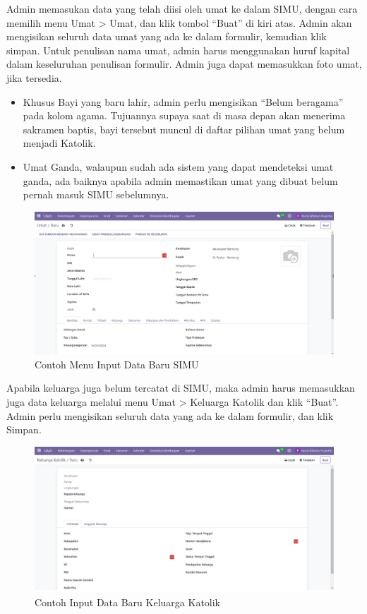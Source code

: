 Admin memasukan data yang telah diisi oleh umat ke dalam SIMU, dengan cara memilih menu Umat > Umat, dan klik tombol “Buat” di kiri atas. Admin akan mengisikan seluruh data umat yang ada ke dalam formulir, kemudian klik simpan. Untuk penulisan nama umat, admin harus menggunakan huruf kapital dalam keseluruhan penulisan formulir. Admin juga dapat memasukkan foto umat, jika tersedia.

\begin{itemize}
	\item Khusus Bayi yang baru lahir, admin perlu mengisikan “Belum beragama” pada kolom agama. Tujuannya supaya saat di masa depan akan menerima sakramen baptis, bayi tersebut muncul di daftar pilihan umat yang belum menjadi Katolik.
	
	\item Umat Ganda, walaupun sudah ada sistem yang dapat mendeteksi umat ganda, ada baiknya apabila admin memastikan umat yang dibuat belum pernah masuk SIMU sebelumnya. 
\end{itemize}

\begin{figure}[H]
	\centering
	\includegraphics[scale=0.6]{Gambar/simuInput.png}
	\caption{Contoh Menu Input Data Baru SIMU} 
	\label{fig:simuInput}
\end{figure}

Apabila keluarga juga belum tercatat di SIMU, maka admin harus memasukkan juga data keluarga melalui menu Umat > Keluarga Katolik dan klik “Buat”. Admin perlu mengisikan seluruh data yang ada ke dalam formulir, dan klik Simpan.

\begin{figure}[H]
	\centering
	\includegraphics[scale=0.55]{Gambar/simuKeluarga.png}
	\caption{Contoh Input Data Baru Keluarga Katolik} 
	\label{fig:simuKeluarga}
\end{figure}

